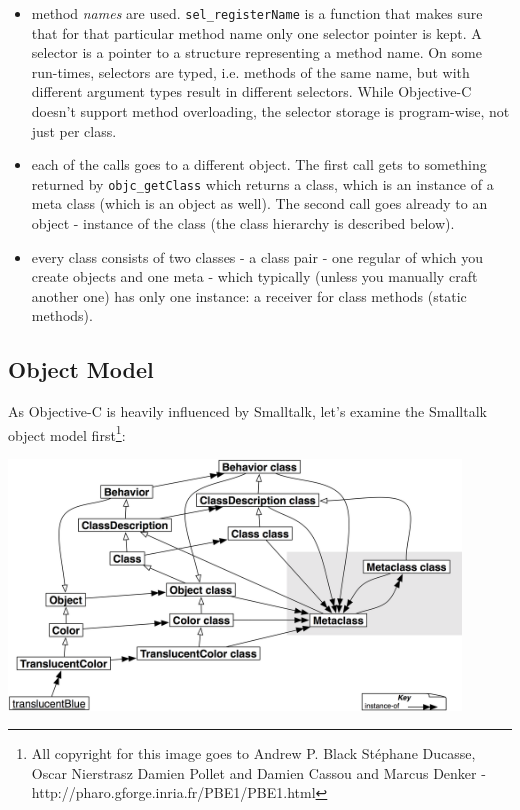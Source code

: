 \begin{itemize}
\item method \emph{names} are used. \verb=sel_registerName= is a function that makes sure that for that particular method name only one selector pointer is kept. A selector is a pointer to a structure representing a method name. On some run-times, selectors are typed, i.e. methods of the same name, but with different argument types result in different selectors. While Objective-C doesn't support method overloading, the selector storage is program-wise, not just per class.
\item each of the calls goes to a different object. The first call gets to something returned by \verb=objc_getClass= which returns a class, which is an instance of a meta class (which is an object as well). The second call goes already to an object - instance of the class (the class hierarchy is described below).
\item every class consists of two classes - a class pair - one regular of which you create objects and one meta - which typically (unless you manually craft another one) has only one instance: a receiver for class methods (static methods).
\end{itemize}

\subsection{Object Model}

As Objective-C is heavily influenced by Smalltalk, let's examine the Smalltalk object model first\footnote{All copyright for this image goes to Andrew P. Black St\'{e}phane Ducasse, Oscar Nierstrasz Damien Pollet and Damien Cassou and Marcus Denker - http://pharo.gforge.inria.fr/PBE1/PBE1.html}:

\vspace{20pt}
\includegraphics[width=120mm]{./img/smalltalk_class_hierarchy.png}
\vspace{20pt}

